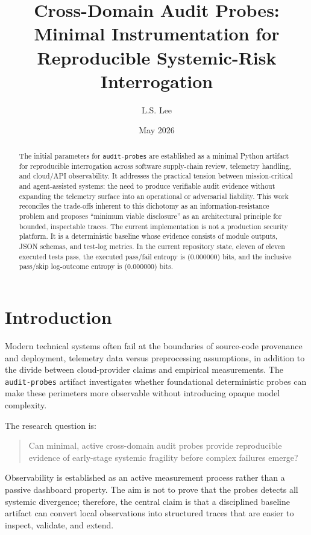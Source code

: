 \documentclass[11pt]{article}
\title{Cross-Domain Audit Probes: Minimal Instrumentation for Reproducible Systemic-Risk Interrogation}
\author{L.S. Lee}
\date{May 2026}
\begin{document}
\maketitle
\thispagestyle{empty}
\newpage

\begin{abstract}
The initial parameters for \texttt{audit-probes} are established as a minimal Python artifact for reproducible interrogation across software supply-chain review, telemetry handling, and cloud/API observability. It addresses the practical tension between mission-critical and agent-assisted systems: the need to
produce verifiable audit evidence without expanding the telemetry surface into an operational or adversarial liability. This work reconciles the trade-offs inherent to this dichotomy as an information-resistance problem and proposes ``minimum viable disclosure'' as an architectural principle for bounded, inspectable traces. The current implementation is not a production security platform. It is a deterministic baseline whose evidence consists of module outputs, JSON schemas, and test-log metrics. In the current repository state, eleven of eleven executed tests pass, the executed pass/fail entropy is (0.000000) bits, and the inclusive pass/skip log-outcome entropy is (0.000000) bits. \end{abstract}
\newpage

\setcounter{page}{1}

\section{Introduction}
Modern technical systems often fail at the boundaries of source-code provenance and deployment, telemetry data versus preprocessing assumptions, in addition to the divide between cloud-provider claims and empirical measurements. The \texttt{audit-probes} artifact investigates whether foundational deterministic probes can make these perimeters more observable without introducing opaque model complexity.

The research question is:

\begin{quote}
Can minimal, active cross-domain audit probes provide reproducible evidence of early-stage systemic fragility before complex failures emerge?
\end{quote}

Observability is established as an active measurement process rather than a passive dashboard property. The aim is not to prove that the probes detects 
all systemic divergence; therefore, the central claim is that a disciplined baseline artifact can convert local observations into structured traces 
that are easier to inspect, validate, and extend.
\end{document}
